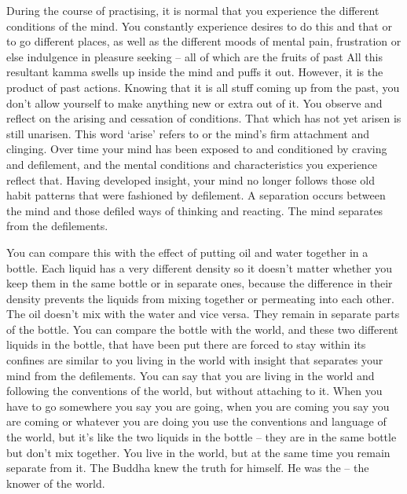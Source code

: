 During the course of practising, it is normal that you experience the different conditions of the mind. You constantly experience desires to do this and that or to go different places, as well as the different moods of mental pain, frustration or else indulgence in pleasure seeking -- all of which are the fruits of past  All this resultant kamma swells up inside the mind and puffs it out. However, it is the product of past actions. Knowing that it is all stuff coming up from the past, you don't allow yourself to make anything new or extra out of it. You observe and reflect on the arising and cessation of conditions. That which has not yet arisen is still unarisen. This word `arise' refers to  or the mind's firm attachment and clinging. Over time your mind has been exposed to and conditioned by craving and defilement, and the mental conditions and characteristics you experience reflect that. Having developed insight, your mind no longer follows those old habit patterns that were fashioned by defilement. A separation occurs between the mind and those defiled ways of thinking and reacting. The mind separates from the defilements.

You can compare this with the effect of putting oil and water together in a bottle. Each liquid has a very different density so it doesn't matter whether you keep them in the same bottle or in separate ones, because the difference in their density prevents the liquids from mixing together or permeating into each other. The oil doesn't mix with the water and vice versa. They remain in separate parts of the bottle. You can compare the bottle with the world, and these two different liquids in the bottle, that have been put there are forced to stay within its confines are similar to you living in the world with insight that separates your mind from the defilements. You can say that you are living in the world and following the conventions of the world, but without attaching to it. When you have to go somewhere you say you are going, when you are coming you say you are coming or whatever you are doing you use the conventions and language of the world, but it's like the two liquids in the bottle -- they are in the same bottle but don't mix together. You live in the world, but at the same time you remain separate from it. The Buddha knew the truth for himself. He was the  -- the knower of the world.

